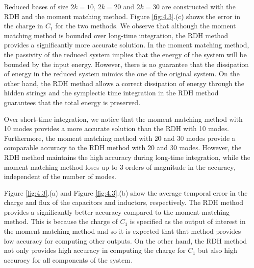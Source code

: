 Reduced bases of size $2k = 10$, $2k = 20$ and $2k = 30$ are constructed with the RDH and the moment matching method. Figure \ref{fig:4.3}.(c) shows the error in the charge in $C_1$ for the two methods. We observe that although the moment matching method is bounded over long-time integration, the RDH method provides a significantly more accurate solution. In the moment matching method, the passivity of the reduced system implies that the energy of the system will be bounded by the input energy. However, there is no guarantee that the dissipation of energy in the reduced system mimics the one of the original system. On the other hand, the RDH method allows a correct dissipation of energy through the hidden strings and the symplectic time integration in the RDH method guarantees that the total energy is preserved.

Over short-time integration, we notice that the moment matching method with 10 modes provides a more accurate solution than the RDH with 10 modes. Furthermore, the moment matching method with 20 and 30 modes provide a comparable accuracy to the RDH method with 20 and 30 modes. However, the RDH method maintains the high accuracy during long-time integration, while the moment matching method loses up to 3 orders of magnitude in the accuracy, independent of the number of modes.

Figure \ref{fig:4.3}.(a) and Figure \ref{fig:4.3}.(b) show the average temporal error in the charge and flux of the capacitors and inductors, respectively. The RDH method provides a significantly better accuracy compared to the moment matching method. This is because the charge of $C_1$ is specified as the output of interest in the moment matching method and so it is expected that that method provides low accuracy for computing other outputs. On the other hand, the RDH method not only provides high accuracy in computing the charge for $C_1$ but also high accuracy for all components of the system.

